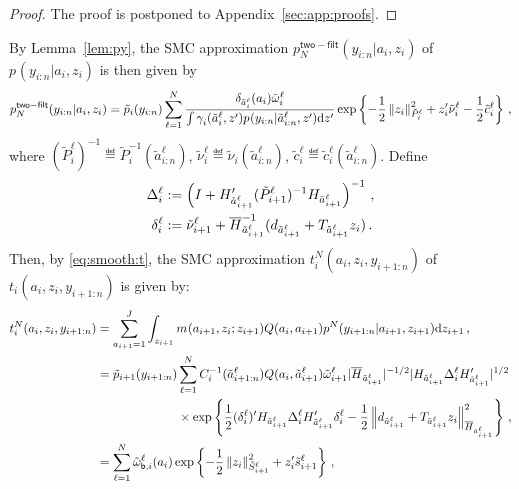 \begin{proof}
The proof is postponed to Appendix~\ref{sec:app:proofs}.
\end{proof}
By Lemma~\ref{lem:py}, the SMC approximation $p^{\mathsf{two-filt}}_{N}(y_{i:n}|a_{i},z_{i})$ of $p_{}(y_{i:n}|a_{i},z_{i})$ is then given by
\begin{equation}
\label{eq:pN:yi:n}
p^{\mathsf{two-filt}}_{N}(y_{i:n}|a_{i},z_{i}) = \tilde{p}_i(y_{i:n}) \sum_{\ell=1}^N  \frac{\delta_{\tilde{a}^{\ell}_i}(a_i)\tilde{\omega}_{i}^{\ell}}{\int \gamma^{}_{i}(\tilde{a}^{\ell}_i,z')p_{}(y_{i:n}|\tilde{a}^{\ell}_{i:n},z')\rmd z'} \exp\left\{- \frac{1}{2}\normMat{\tilde{P}^{\ell}_{i}}{z_i}^2 + z'_i\tilde{\nu}^{\ell}_{i} - \frac{1}{2} \tilde{c}^{\ell}_i \right\}\eqsp,
\end{equation}
where $(\tilde{P}^{\ell}_{i})^{-1} \eqdef \tilde{P}_{i}^{-1}(\tilde{a}^{\ell}_{i:n})$, $\tilde{\nu}^{\ell}_{i}\eqdef \tilde{\nu}_{i}(\tilde{a}^{\ell}_{i:n})$, $\tilde{c}^{\ell}_{i} \eqdef \tilde{c}^{\ell}_{i}(\tilde{a}^{\ell}_{i:n})$. Define
\begin{align*}
\Delta^{\ell}_{i} &\eqdef \left(I + H'_{\tilde{a}^\ell_{i+1}}(\tilde{P}^{\ell}_{i+1})^{-1}H_{\tilde{a}^\ell_{i+1}}\right)^{-1}\eqsp,\\
\delta^{\ell}_{i}&\eqdef\tilde{\nu}^{\ell}_{i+1} + \barH_{\tilde{a}^\ell_{i+1}}^{-1}(d_{\tilde{a}^\ell_{i+1}}+T_{\tilde{a}^\ell_{i+1}}z_i)\eqsp.
\end{align*}
Then, by \eqref{eq:smooth:t}, the SMC approximation $t^N_{i}(a_i,z_i,y_{i+1:n})$ of $t_{i}(a_i,z_i,y_{i+1:n})$ is given by:
\begin{align}
t^N_{i}(a_i,z_i,y_{i+1:n}) &=\sum_{a_{i+1}=1}^J\int_{z_{i+1}}m_{}(a_{i+1},z_{i};z_{i+1})Q(a_{i},a_{i+1})p^N_{}(y_{i+1:n}|a_{i+1},z_{i+1}) \rmd z_{i+1}\eqsp,\nonumber\\
&=  \tilde{p}_{i+1}(y_{i+1:n}) \sum_{\ell=1}^N C_i^{-1}(\tilde{a}^{\ell}_{i+1:n}) Q(a_i, \tilde{a}^{\ell}_{i+1}) \tilde{\omega}^{\ell}_{i+1} |\barH_{\tilde{a}^{\ell}_{i+1}}|^{-1/2} |H_{\tilde{a}^{\ell}_{i+1}} \Delta^{\ell}_i H'_{\tilde{a}^{\ell}_{i+1}}|^{1/2} \eqsp\nonumber \\
&\hspace{2.3cm} \times \exp\left\{\frac{1}{2} (\delta^{\ell}_i)'H_{\tilde{a}^{\ell}_{i+1}}\Delta^{\ell}_iH'_{\tilde{a}^{\ell}_{i+1}} \delta^{\ell}_i -\frac{1}{2}\normMat{\barH_{\tilde{a}^{\ell}_{i+1}}}{d_{\tilde{a}^{\ell}_{i+1}}+T_{\tilde{a}^{\ell}_{i+1}}z_i}^2\right\} \eqsp,\\
&= \sum_{\ell=1}^N\tilde{\omega}_{\mathsf{b},i}^\ell(a_i)\exp\left\{-\frac{1}{2}\normMat{\tilde{S}_{i+1}^\ell}{z_i}^2+z_i'\tilde{s}_{i+1}^\ell\right\}\eqsp,\label{eq:tN}
\end{align}
